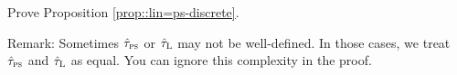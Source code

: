 \begin{HomeworkProblem}\label{exr:6-11}

 Prove Proposition \ref{prop::lin=ps-discrete}.


Remark:  Sometimes $\hat{\tau}_{\textsc{ps}}$ or $ \hat{\tau}_\textsc{L}$ may not be well-defined. In those cases, we treat $\hat{\tau}_{\textsc{ps}}$ and $ \hat{\tau}_\textsc{L}$ as equal. You can ignore this complexity in the proof.

%
%
%



%
%
%
%
%
%


\end{HomeworkProblem}

